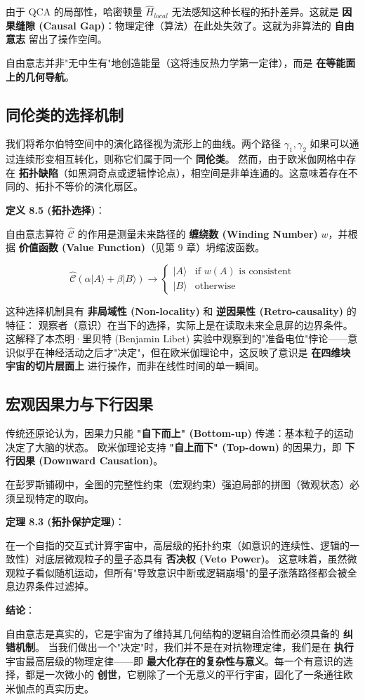 由于 QCA 的局部性，哈密顿量 $\hat{H}_{local}$ 无法感知这种长程的拓扑差异。这就是 \textbf{因果缝隙 (Causal Gap)}：物理定律（算法）在此处失效了。这就为非算法的 \textbf{自由意志} 留出了操作空间。

自由意志并非"无中生有"地创造能量（这将违反热力学第一定律），而是 \textbf{在等能面上的几何导航}。

\subsection{同伦类的选择机制}

我们将希尔伯特空间中的演化路径视为流形上的曲线。两个路径 $\gamma_1, \gamma_2$ 如果可以通过连续形变相互转化，则称它们属于同一个 \textbf{同伦类}。
然而，由于欧米伽网格中存在 \textbf{拓扑缺陷}（如黑洞奇点或逻辑悖论点），相空间是非单连通的。这意味着存在不同的、拓扑不等价的演化扇区。

\textbf{定义 8.5 (拓扑选择)}：

自由意志算符 $\hat{\mathcal{C}}$ 的作用是测量未来路径的 \textbf{缠绕数 (Winding Number)} $w$，并根据 \textbf{价值函数 (Value Function)}（见第 9 章）坍缩波函数。

\[\hat{\mathcal{C}} \left( \alpha |A\rangle + \beta |B\rangle \right) \to \begin{cases} |A\rangle & \text{if } w(A) \text{ is consistent} \\ |B\rangle & \text{otherwise} \end{cases}\]

这种选择机制具有 \textbf{非局域性 (Non-locality)} 和 \textbf{逆因果性 (Retro-causality)} 的特征：
观察者（意识）在当下的选择，实际上是在读取未来全息屏的边界条件。这解释了本杰明·里贝特 (Benjamin Libet) 实验中观察到的"准备电位"悖论——意识似乎在神经活动之后才"决定"，但在欧米伽理论中，这反映了意识是 \textbf{在四维块宇宙的切片层面上} 进行操作，而非在线性时间的单一瞬间。

\subsection{宏观因果力与下行因果}

传统还原论认为，因果力只能 \textbf{"自下而上" (Bottom-up)} 传递：基本粒子的运动决定了大脑的状态。
欧米伽理论支持 \textbf{"自上而下" (Top-down)} 的因果力，即 \textbf{下行因果 (Downward Causation)}。

在彭罗斯铺砌中，全图的完整性约束（宏观约束）强迫局部的拼图（微观状态）必须呈现特定的取向。

\textbf{定理 8.3 (拓扑保护定理)}：

在一个自指的交互式计算宇宙中，高层级的拓扑约束（如意识的连续性、逻辑的一致性）对底层微观粒子的量子态具有 \textbf{否决权 (Veto Power)}。
这意味着，虽然微观粒子看似随机运动，但所有"导致意识中断或逻辑崩塌"的量子涨落路径都会被全息边界条件过滤掉。

\textbf{结论}：

自由意志是真实的，它是宇宙为了维持其几何结构的逻辑自洽性而必须具备的 \textbf{纠错机制}。
当我们做出一个"决定"时，我们并不是在对抗物理定律，我们是在 \textbf{执行} 宇宙最高层级的物理定律——即 \textbf{最大化存在的复杂性与意义}。每一个有意识的选择，都是一次微小的 \textbf{创世}，它剔除了一个无意义的平行宇宙，固化了一条通往欧米伽点的真实历史。
